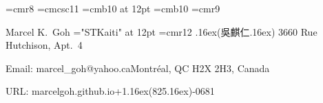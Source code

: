 
\def\today{\ifcase\month\or
  January\or February\or March\or April\or May\or June\or
  July\or August\or September\or October\or November\or December\fi
  \space\number\day, \number\year}
\newcount\twodigits
\def\hours{\twodigits=\time \divide\twodigits by 60 \printtwodigits
  \multiply\twodigits by-60 \advance\twodigits by\time :\printtwodigits}
\def\gobbleone1{}
\def\printtwodigits{\advance\twodigits100
  \expandafter\gobbleone\number\twodigits
  \advance\twodigits-100 }

\font\eightrm=cmr8
\font\elevensc=cmcsc11  %
\font\bigbold=cmb10 at 12pt  %
\font\tenb=cmb10
\font\mc=cmr9

\let\tenbf=\tenb

\newdimen\itemindent
\newif\ifitempar \itempartrue
\def\itemindentset#1{\setbox0\hbox{{\bf #1.\kern.25em}}\itemindent=\wd0\relax}
\def\pubbegin #1{\itemindentset{#11}} %
\def\ppubbegin #1{\itemindentset{#111}} %
\def\pubitem#1.{\ifitempar\smallskip\noindent\else\itempartrue
  \hskip-\parindent\fi
  \hbox to\itemindent{\bf\hfil #1.\kern.25em}%
  \hangindent=\itemindent\hangafter=1\ignorespaces}

\def\up#1{\leavevmode \raise.16ex\hbox{#1}}
\def\sectheader#1{{\bigskip\elevensc #1}\smallskip\hrule\medskip}
\def\leftright#1#2{{#1}\hfill{#2}\par}
\def\CEE{{\mc C}}
\def\UNIX{{\mc UNIX}}
\def\thing{\item{$\bullet$}}

\parindent=0pt  %

\newcount\submittedcount
{}
\def\subitem{\pubitem S\the\submittedcount. \global\advance\submittedcount by 1}
\newcount\reportcount
{}
\def\repitem{\pubitem R\the\reportcount. \global\advance\reportcount by 1}

\def\datethis{\eightrm Last updated \today\ at\ \hours.}



\leftright{\bigbold Marcel K.\ Goh
\ifx\Umathchar\undefined\else%
\font\chinese="STKaiti" at 12pt%
\font\twelverm=cmr12%
\twelverm\up({\chinese 吳麒仁}\up)%
\fi}{3660 Rue Hutchison, Apt.\ 4}
\leftright{Email: marcel\_goh@yahoo.ca}{Montr\'eal, QC H2X 2H3, Canada}
\leftright{URL: marcelgoh.github.io}{+1\thinspace\up(825\up)\thinspace 440-0681}

